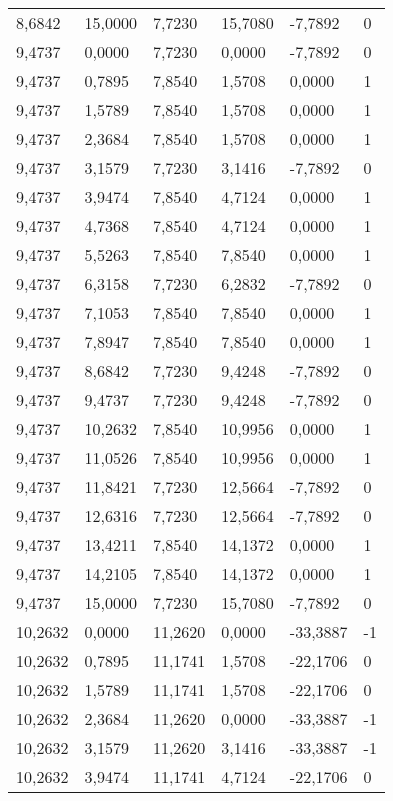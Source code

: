 \begin{longtable}{@{}llllll@{}}
		8,6842  & 15,0000 & 7,7230  & 15,7080 & -7,7892  & 0  \\
		9,4737  & 0,0000  & 7,7230  & 0,0000  & -7,7892  & 0  \\
		9,4737  & 0,7895  & 7,8540  & 1,5708  & 0,0000   & 1  \\
		9,4737  & 1,5789  & 7,8540  & 1,5708  & 0,0000   & 1  \\
		9,4737  & 2,3684  & 7,8540  & 1,5708  & 0,0000   & 1  \\
		9,4737  & 3,1579  & 7,7230  & 3,1416  & -7,7892  & 0  \\
		9,4737  & 3,9474  & 7,8540  & 4,7124  & 0,0000   & 1  \\
		9,4737  & 4,7368  & 7,8540  & 4,7124  & 0,0000   & 1  \\
		9,4737  & 5,5263  & 7,8540  & 7,8540  & 0,0000   & 1  \\
		9,4737  & 6,3158  & 7,7230  & 6,2832  & -7,7892  & 0  \\
		9,4737  & 7,1053  & 7,8540  & 7,8540  & 0,0000   & 1  \\
		9,4737  & 7,8947  & 7,8540  & 7,8540  & 0,0000   & 1  \\
		9,4737  & 8,6842  & 7,7230  & 9,4248  & -7,7892  & 0  \\
		9,4737  & 9,4737  & 7,7230  & 9,4248  & -7,7892  & 0  \\
		9,4737  & 10,2632 & 7,8540  & 10,9956 & 0,0000   & 1  \\
		9,4737  & 11,0526 & 7,8540  & 10,9956 & 0,0000   & 1  \\
		9,4737  & 11,8421 & 7,7230  & 12,5664 & -7,7892  & 0  \\
		9,4737  & 12,6316 & 7,7230  & 12,5664 & -7,7892  & 0  \\
		9,4737  & 13,4211 & 7,8540  & 14,1372 & 0,0000   & 1  \\
		9,4737  & 14,2105 & 7,8540  & 14,1372 & 0,0000   & 1  \\
		9,4737  & 15,0000 & 7,7230  & 15,7080 & -7,7892  & 0  \\
		10,2632 & 0,0000  & 11,2620 & 0,0000  & -33,3887 & -1 \\
		10,2632 & 0,7895  & 11,1741 & 1,5708  & -22,1706 & 0  \\
		10,2632 & 1,5789  & 11,1741 & 1,5708  & -22,1706 & 0  \\
		10,2632 & 2,3684  & 11,2620 & 0,0000  & -33,3887 & -1 \\
		10,2632 & 3,1579  & 11,2620 & 3,1416  & -33,3887 & -1 \\
		10,2632 & 3,9474  & 11,1741 & 4,7124  & -22,1706 & 0  \\

\end{longtable}
